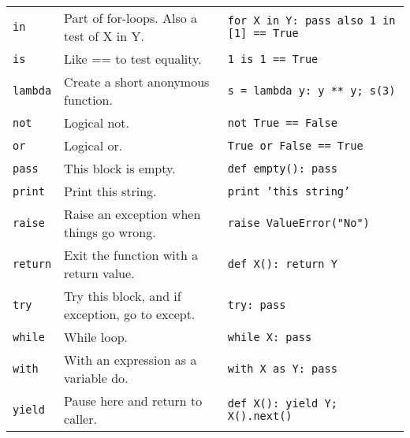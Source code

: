 \begin{table}[htbp]
\begin{minipage}{\linewidth}
\begin{tabulary}{\textwidth}{@{}LLL@{}}
    \texttt{in}&Part of for-loops. Also a test of X in Y.&\texttt{for X in Y: pass also 1 in [1] == True}\\
    \texttt{is}&Like == to test equality.&\texttt{1 is 1 == True}\\
    \texttt{lambda}&Create a short anonymous function.&\texttt{s = lambda y: y ** y; s(3)}\\
    \texttt{not}&Logical not.&\texttt{not True == False}\\
    \texttt{or}&Logical or.&\texttt{True or False == True}\\
    \texttt{pass}&This block is empty.&\texttt{def empty(): pass}\\
    \texttt{print}&Print this string.&\texttt{print 'this string'}\\
    \texttt{raise}&Raise an exception when things go wrong.&\texttt{raise ValueError("No")}\\
    \texttt{return}&Exit the function with a return value.&\texttt{def X(): return Y}\\
    \texttt{try}&Try this block, and if exception, go to except.&\texttt{try: pass}\\
    \texttt{while}&While loop.&\texttt{while X: pass}\\
    \texttt{with}&With an expression as a variable do.&\texttt{with X as Y: pass}\\
    \texttt{yield}&Pause here and return to caller.&\texttt{def X(): yield Y; X().next()}\\
    
    \bottomrule

  \end{tabulary}
      \end{minipage}
      \end{table}


